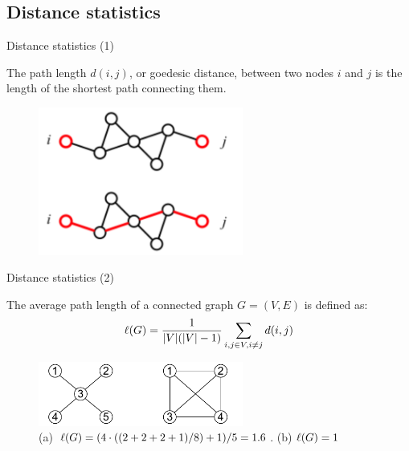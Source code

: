 \subsection{Distance statistics}

\begin{frame}{Distance statistics (1)}

\begin{definition}
The \alert{path length} $d(i,j)$, or \alert{goedesic distance}, between two nodes $i$ and $j$ is the length
of the shortest path connecting them. 
\end{definition}

\begin{figure}
\includegraphics[width=0.6\textwidth]{figs/08/distance}
\end{figure}

\end{frame}

\begin{frame}{Distance statistics (2)}
	
\begin{definition}
The \alert{average path length} of a connected graph $G=(V,E)$ is defined as:
\[
  \ell(G) = \frac{1}{|V|(|V|-1)} \sum_{i,j \in V, i \neq j} d(i,j)
\]
\end{definition}

\begin{figure}
\includegraphics[width=0.6\textwidth]{figs/08/diameter}
\caption{(a) $\ell(G) = (4 \cdot ((2+2+2+1)/8) + 1)/5=1.6$. (b) $\ell(G) = 1$}
\end{figure}

\end{frame}


